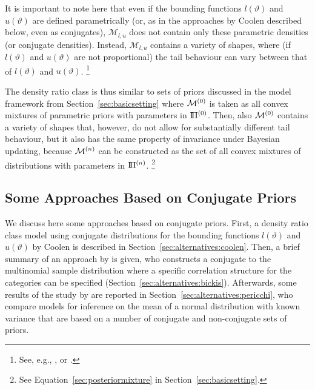 It is important to note here that even if the bounding functions $l(\vartheta)$ and $u(\vartheta)$ are defined parametrically
(or, as in the approaches by Coolen \parencite*{1993:coolen, 1994:coolen} described below, even as conjugates),
$\mathcal{M}_{l,u}$ does not contain only these parametric densities (or conjugate densities).
Instead, $\mathcal{M}_{l,u}$ contains a variety of shapes, where
(if $l(\vartheta)$ and $u(\vartheta)$ are not proportional)
the tail behaviour can vary between that of $l(\vartheta)$ and $u(\vartheta)$.%
\footnote{See, e.g., \textcite[\S 3.2]{2011:rinderknecht}, or \textcite[\S 4.3]{1991:pericchi}.}

The density ratio class is thus similar to sets of priors
discussed in the model framework from Section~\ref{sec:basicsetting} where
$\mathcal{M}^{(0)}$ is taken as all convex mixtures of parametric priors with parameters in $\text{I}\!\Pi^{(0)}$.
Then, also $\mathcal{M}^{(0)}$ contains a variety of shapes that, however,
do not allow for substantially different tail behaviour,
but it also has the same property of invariance under Bayesian updating,
because $\mathcal{M}^{(n)}$ can be constructed as the set of all convex mixtures of distributions with parameters in $\text{I}\!\Pi^{(n)}$.%
\footnote{See Equation~\eqref{sec:posteriormixture} in Section~\ref{sec:basicsetting}.}


\subsection{Some Approaches Based on Conjugate Priors}
\label{sec:alternatives:conjugate}

We discuss here some approaches based on conjugate priors.
First, a density ratio class model using conjugate distributions
for the bounding functions $l(\vartheta)$ and $u(\vartheta)$
by Coolen \parencite*{1993:coolen,1994:coolen} is described in Section~\ref{sec:alternatives:coolen}.
Then, a brief summary of an approach by \textcite{2009:bickis} is given,
who constructs a conjugate to the multinomial sample distribution
where a specific correlation structure for the categories can be specified (Section~\ref{sec:alternatives:bickis}).
Afterwards, some results of the study by \textcite{1991:pericchi} are reported in Section~\ref{sec:alternatives:pericchi},
who compare models for inference on the mean of a normal distribution with known variance
that are based on a number of conjugate and non-conjugate sets of priors.
 

